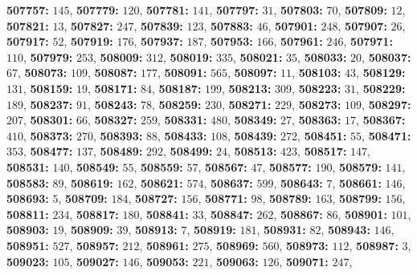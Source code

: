 \textsf{\bfseries 507757:} $145$, \textsf{\bfseries 507779:} $120$, \textsf{\bfseries 507781:} $141$, \textsf{\bfseries 507797:} $31$, \textsf{\bfseries 507803:} $70$, \textsf{\bfseries 507809:} $12$, \textsf{\bfseries 507821:} $13$, \textsf{\bfseries 507827:} $247$, \textsf{\bfseries 507839:} $123$, \textsf{\bfseries 507883:} $46$, \textsf{\bfseries 507901:} $248$, \textsf{\bfseries 507907:} $26$, \textsf{\bfseries 507917:} $52$, \textsf{\bfseries 507919:} $176$, \textsf{\bfseries 507937:} $187$, \textsf{\bfseries 507953:} $166$, \textsf{\bfseries 507961:} $246$, \textsf{\bfseries 507971:} $110$, \textsf{\bfseries 507979:} $253$, \textsf{\bfseries 508009:} $312$, \textsf{\bfseries 508019:} $335$, \textsf{\bfseries 508021:} $35$, \textsf{\bfseries 508033:} $20$, \textsf{\bfseries 508037:} $67$, \textsf{\bfseries 508073:} $109$, \textsf{\bfseries 508087:} $177$, \textsf{\bfseries 508091:} $565$, \textsf{\bfseries 508097:} $11$, \textsf{\bfseries 508103:} $43$, \textsf{\bfseries 508129:} $131$, \textsf{\bfseries 508159:} $19$, \textsf{\bfseries 508171:} $84$, \textsf{\bfseries 508187:} $199$, \textsf{\bfseries 508213:} $309$, \textsf{\bfseries 508223:} $31$, \textsf{\bfseries 508229:} $189$, \textsf{\bfseries 508237:} $91$, \textsf{\bfseries 508243:} $78$, \textsf{\bfseries 508259:} $230$, \textsf{\bfseries 508271:} $229$, \textsf{\bfseries 508273:} $109$, \textsf{\bfseries 508297:} $207$, \textsf{\bfseries 508301:} $66$, \textsf{\bfseries 508327:} $259$, \textsf{\bfseries 508331:} $480$, \textsf{\bfseries 508349:} $27$, \textsf{\bfseries 508363:} $17$, \textsf{\bfseries 508367:} $410$, \textsf{\bfseries 508373:} $270$, \textsf{\bfseries 508393:} $88$, \textsf{\bfseries 508433:} $108$, \textsf{\bfseries 508439:} $272$, \textsf{\bfseries 508451:} $55$, \textsf{\bfseries 508471:} $353$, \textsf{\bfseries 508477:} $137$, \textsf{\bfseries 508489:} $292$, \textsf{\bfseries 508499:} $24$, \textsf{\bfseries 508513:} $423$, \textsf{\bfseries 508517:} $147$, \textsf{\bfseries 508531:} $140$, \textsf{\bfseries 508549:} $55$, \textsf{\bfseries 508559:} $57$, \textsf{\bfseries 508567:} $47$, \textsf{\bfseries 508577:} $190$, \textsf{\bfseries 508579:} $141$, \textsf{\bfseries 508583:} $89$, \textsf{\bfseries 508619:} $162$, \textsf{\bfseries 508621:} $574$, \textsf{\bfseries 508637:} $599$, \textsf{\bfseries 508643:} $7$, \textsf{\bfseries 508661:} $146$, \textsf{\bfseries 508693:} $5$, \textsf{\bfseries 508709:} $184$, \textsf{\bfseries 508727:} $156$, \textsf{\bfseries 508771:} $98$, \textsf{\bfseries 508789:} $163$, \textsf{\bfseries 508799:} $156$, \textsf{\bfseries 508811:} $234$, \textsf{\bfseries 508817:} $180$, \textsf{\bfseries 508841:} $33$, \textsf{\bfseries 508847:} $262$, \textsf{\bfseries 508867:} $86$, \textsf{\bfseries 508901:} $101$, \textsf{\bfseries 508903:} $19$, \textsf{\bfseries 508909:} $39$, \textsf{\bfseries 508913:} $7$, \textsf{\bfseries 508919:} $181$, \textsf{\bfseries 508931:} $82$, \textsf{\bfseries 508943:} $146$, \textsf{\bfseries 508951:} $527$, \textsf{\bfseries 508957:} $212$, \textsf{\bfseries 508961:} $275$, \textsf{\bfseries 508969:} $560$, \textsf{\bfseries 508973:} $112$, \textsf{\bfseries 508987:} $3$, \textsf{\bfseries 509023:} $105$, \textsf{\bfseries 509027:} $146$, \textsf{\bfseries 509053:} $221$, \textsf{\bfseries 509063:} $126$, \textsf{\bfseries 509071:} $247$, 
